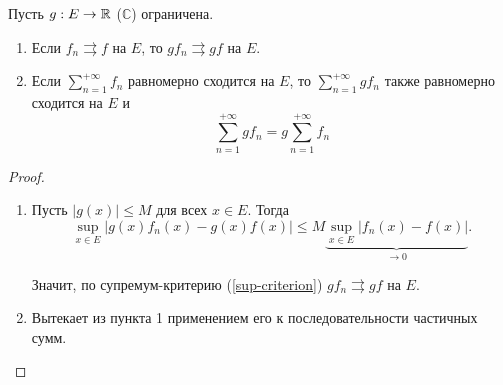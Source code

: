 \begin{property}
    Пусть $g : E \rightarrow \mathbb{R}$ ($\mathbb{C}$) ограничена.

    \begin{enumerate}
        \item Если $f_n \rightrightarrows f$ на $E$, то $gf_n \rightrightarrows gf$ на $E$.

        \item Если $\sum_{n = 1}^{+\infty} f_n$ равномерно сходится на $E$, то $\sum_{n = 1}^{+\infty} gf_n$ также равномерно сходится на $E$ и
            \[
                \sum_{n = 1}^{+\infty} gf_n = g\sum_{n = 1}^{+\infty} f_n
            \]
    \end{enumerate}

    \begin{proof}~
    
        \begin{enumerate}
            \item Пусть $|g(x)| \le M$ для всех $x \in E$. Тогда 
            \[
                \sup_{x \in E} |g(x)f_n(x) - g(x)f(x)| \le M \underbrace{\sup_{x \in E}|f_n(x) - f(x)|}_{\to 0}.
            \]
    
            Значит, по супремум-критерию (\ref{sup-criterion}) $gf_{n} \rightrightarrows gf$ на $E$.
            
            \item Вытекает из пункта 1 применением его к последовательности частичных сумм.
        \end{enumerate}
    \end{proof}
\end{property}